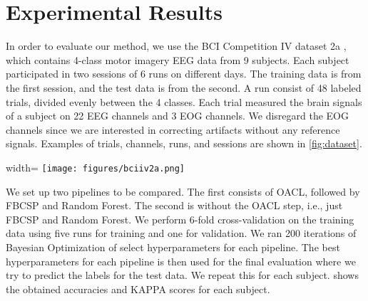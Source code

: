 \section{Experimental Results}

In order to evaluate our method, we use the BCI Competition IV dataset 2a \citep{brunner2008bci}, which contains 4-class motor imagery EEG data from 9 subjects. Each subject participated in two sessions of 6 runs on different days. The training data is from the first session, and the test data is from the second. A run consist of 48 labeled trials, divided evenly between the 4 classes. Each trial measured the brain signals of a subject on 22 EEG channels and 3 EOG channels. We disregard the EOG channels since we are interested in correcting artifacts without any reference signals. Examples of trials, channels, runs, and sessions are shown in \cref{fig:dataset}.

\begin{figure*}
	\centering
	\begin{adjustbox}{width=\textwidth}
		\texttt{[image: figures/bciiv2a.png]}
	\end{adjustbox}
	\caption{Sessions, runs, channels, trials, and the relations between them.}
	\label{fig:dataset}
\end{figure*}

We set up two pipelines to be compared. The first consists of OACL, followed by FBCSP and Random Forest. The second is without the OACL step, i.e., just FBCSP and Random Forest. We perform 6-fold cross-validation on the training data using five runs for training and one for validation. We ran 200 iterations of Bayesian Optimization of select hyperparameters for each pipeline. The best hyperparameters for each pipeline is then used for the final evaluation where we try to predict the labels for the test data. We repeat this for each subject.  shows the obtained accuracies and KAPPA scores for each subject.

